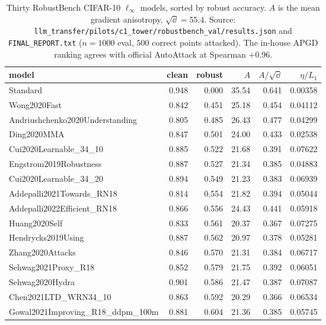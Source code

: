 \begin{table}[t]\centering
\caption{Thirty RobustBench CIFAR-10 $\ell_\infty$ models, sorted by robust
accuracy. $A$ is the mean gradient anisotropy, $\sqrt\dd{=}55.4$. Source:
\texttt{llm\_transfer/pilots/c1\_tower/robustbench\_val/results.json} and
\texttt{FINAL\_REPORT.txt} ($n{=}1000$ eval, $500$ correct points attacked). The
in-house APGD ranking agrees with official AutoAttack at Spearman $+0.96$.}
\label{tab:robustbench-full}
\scriptsize
\begin{tabular}{lrrrrr}
\toprule
model & clean & robust & $A$ & $A/\sqrt\dd$ & $\eta/L_1$ \\
\midrule
Standard                             & 0.948 & 0.000 & 35.54 & 0.641 & 0.00358 \\
Wong2020Fast                         & 0.842 & 0.451 & 25.18 & 0.454 & 0.04112 \\
Andriushchenko2020Understanding      & 0.805 & 0.485 & 26.43 & 0.477 & 0.04299 \\
Ding2020MMA                          & 0.847 & 0.501 & 24.00 & 0.433 & 0.02538 \\
Cui2020Learnable\_34\_10             & 0.885 & 0.522 & 21.68 & 0.391 & 0.07622 \\
Engstrom2019Robustness               & 0.887 & 0.527 & 21.34 & 0.385 & 0.04883 \\
Cui2020Learnable\_34\_20             & 0.894 & 0.549 & 21.23 & 0.383 & 0.06939 \\
Addepalli2021Towards\_RN18           & 0.814 & 0.554 & 21.82 & 0.394 & 0.05044 \\
Addepalli2022Efficient\_RN18         & 0.866 & 0.556 & 24.43 & 0.441 & 0.05918 \\
Huang2020Self                        & 0.833 & 0.561 & 20.37 & 0.367 & 0.07275 \\
Hendrycks2019Using                   & 0.887 & 0.562 & 20.97 & 0.378 & 0.05281 \\
Zhang2020Attacks                     & 0.846 & 0.570 & 21.31 & 0.384 & 0.06717 \\
Sehwag2021Proxy\_R18                 & 0.852 & 0.579 & 21.75 & 0.392 & 0.06051 \\
Sehwag2020Hydra                      & 0.901 & 0.586 & 21.47 & 0.387 & 0.07087 \\
Chen2021LTD\_WRN34\_10               & 0.863 & 0.592 & 20.29 & 0.366 & 0.06534 \\
Gowal2021Improving\_R18\_ddpm\_100m  & 0.881 & 0.604 & 21.36 & 0.385 & 0.05745 \\

\end{tabular}
\end{table}
